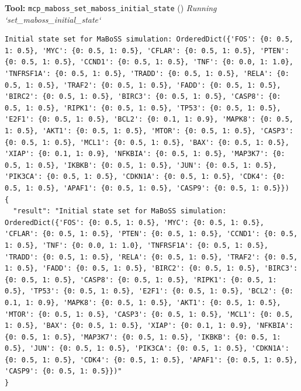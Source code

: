 \documentclass[11pt,a4paper]{article}
\begin{document}
\begin{toolokbox}
\textbf{Tool:} \texttt{mcp\_maboss\_set\_maboss\_initial\_state} (\checkmark)
\textit{Running `set\_maboss\_initial\_state`}
\begin{lstlisting}
Initial state set for MaBoSS simulation: OrderedDict({'FOS': {0: 0.5, 1: 0.5}, 'MYC': {0: 0.5, 1: 0.5}, 'CFLAR': {0: 0.5, 1: 0.5}, 'PTEN': {0: 0.5, 1: 0.5}, 'CCND1': {0: 0.5, 1: 0.5}, 'TNF': {0: 0.0, 1: 1.0}, 'TNFRSF1A': {0: 0.5, 1: 0.5}, 'TRADD': {0: 0.5, 1: 0.5}, 'RELA': {0: 0.5, 1: 0.5}, 'TRAF2': {0: 0.5, 1: 0.5}, 'FADD': {0: 0.5, 1: 0.5}, 'BIRC2': {0: 0.5, 1: 0.5}, 'BIRC3': {0: 0.5, 1: 0.5}, 'CASP8': {0: 0.5, 1: 0.5}, 'RIPK1': {0: 0.5, 1: 0.5}, 'TP53': {0: 0.5, 1: 0.5}, 'E2F1': {0: 0.5, 1: 0.5}, 'BCL2': {0: 0.1, 1: 0.9}, 'MAPK8': {0: 0.5, 1: 0.5}, 'AKT1': {0: 0.5, 1: 0.5}, 'MTOR': {0: 0.5, 1: 0.5}, 'CASP3': {0: 0.5, 1: 0.5}, 'MCL1': {0: 0.5, 1: 0.5}, 'BAX': {0: 0.5, 1: 0.5}, 'XIAP': {0: 0.1, 1: 0.9}, 'NFKBIA': {0: 0.5, 1: 0.5}, 'MAP3K7': {0: 0.5, 1: 0.5}, 'IKBKB': {0: 0.5, 1: 0.5}, 'JUN': {0: 0.5, 1: 0.5}, 'PIK3CA': {0: 0.5, 1: 0.5}, 'CDKN1A': {0: 0.5, 1: 0.5}, 'CDK4': {0: 0.5, 1: 0.5}, 'APAF1': {0: 0.5, 1: 0.5}, 'CASP9': {0: 0.5, 1: 0.5}})
{
  "result": "Initial state set for MaBoSS simulation: OrderedDict({'FOS': {0: 0.5, 1: 0.5}, 'MYC': {0: 0.5, 1: 0.5}, 'CFLAR': {0: 0.5, 1: 0.5}, 'PTEN': {0: 0.5, 1: 0.5}, 'CCND1': {0: 0.5, 1: 0.5}, 'TNF': {0: 0.0, 1: 1.0}, 'TNFRSF1A': {0: 0.5, 1: 0.5}, 'TRADD': {0: 0.5, 1: 0.5}, 'RELA': {0: 0.5, 1: 0.5}, 'TRAF2': {0: 0.5, 1: 0.5}, 'FADD': {0: 0.5, 1: 0.5}, 'BIRC2': {0: 0.5, 1: 0.5}, 'BIRC3': {0: 0.5, 1: 0.5}, 'CASP8': {0: 0.5, 1: 0.5}, 'RIPK1': {0: 0.5, 1: 0.5}, 'TP53': {0: 0.5, 1: 0.5}, 'E2F1': {0: 0.5, 1: 0.5}, 'BCL2': {0: 0.1, 1: 0.9}, 'MAPK8': {0: 0.5, 1: 0.5}, 'AKT1': {0: 0.5, 1: 0.5}, 'MTOR': {0: 0.5, 1: 0.5}, 'CASP3': {0: 0.5, 1: 0.5}, 'MCL1': {0: 0.5, 1: 0.5}, 'BAX': {0: 0.5, 1: 0.5}, 'XIAP': {0: 0.1, 1: 0.9}, 'NFKBIA': {0: 0.5, 1: 0.5}, 'MAP3K7': {0: 0.5, 1: 0.5}, 'IKBKB': {0: 0.5, 1: 0.5}, 'JUN': {0: 0.5, 1: 0.5}, 'PIK3CA': {0: 0.5, 1: 0.5}, 'CDKN1A': {0: 0.5, 1: 0.5}, 'CDK4': {0: 0.5, 1: 0.5}, 'APAF1': {0: 0.5, 1: 0.5}, 'CASP9': {0: 0.5, 1: 0.5}})"
}
\end{lstlisting}
\end{toolokbox}
\end{document}
